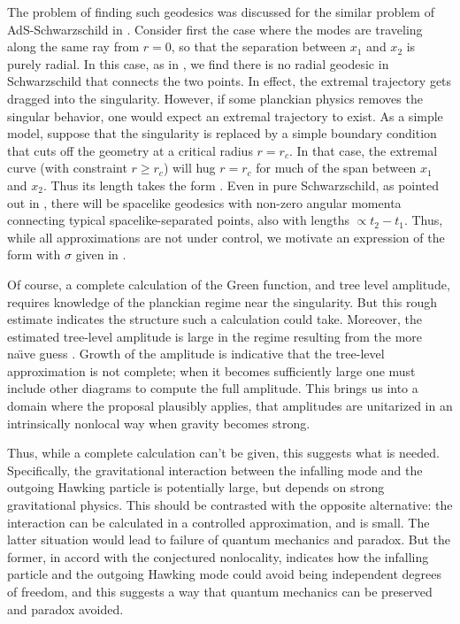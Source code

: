 The problem of finding such geodesics was discussed for the similar problem of AdS-Schwarzschild in .  Consider first the case where the modes are traveling along the same ray from $r=0$, so that the separation  between $x_1$ and $x_2$ is purely radial.   In this case, as in \FHKS, we find there is no radial geodesic in Schwarzschild that connects the two points.  In effect, the extremal trajectory gets dragged into the singularity.  However, if some planckian physics removes the singular behavior, one would expect an extremal trajectory to exist.  As a simple model, suppose that the singularity is replaced by a simple boundary condition that cuts off the geometry at a critical radius $r=r_c$.  In that case, the extremal curve (with constraint $r\geq r_c$) will hug $r=r_c$ for much of the span between $x_1$ and $x_2$.  Thus its length takes the form \distance.  Even in pure Schwarzschild, as pointed out in \FHKS, there will be spacelike geodesics with non-zero angular momenta connecting typical spacelike-separated points, also with lengths $\propto t_2-t_1$.  Thus, while all approximations are not under control, we motivate an expression of the form
%
\eqn{}
%
with $\sigma$ given in \distance.

Of course, a complete calculation of the Green function, and tree level amplitude, requires knowledge of the planckian regime near the singularity.  But this rough estimate indicates the structure such a calculation could take.  Moreover, the estimated tree-level amplitude is large in the regime resulting from the more na\"\i ve guess \locbd.  Growth of the amplitude is indicative that the tree-level approximation is not complete; when it becomes sufficiently large one must include other diagrams to compute the full amplitude.  This brings us into a domain where the proposal plausibly applies,  that  amplitudes are unitarized in an intrinsically nonlocal way when gravity becomes strong.

Thus, while a complete calculation can't be given, this suggests  what is needed.  Specifically, the gravitational interaction between the infalling mode and the outgoing Hawking particle is potentially large, but depends on strong gravitational physics.  This should be contrasted with the opposite alternative:  the interaction can be calculated in a controlled approximation, and is small.  The latter situation would lead to failure of quantum mechanics and paradox.  But the former, in accord with the conjectured nonlocality, indicates how the infalling particle and the outgoing Hawking mode could avoid being independent degrees of freedom, and this suggests a way that quantum mechanics can be preserved and paradox avoided.

